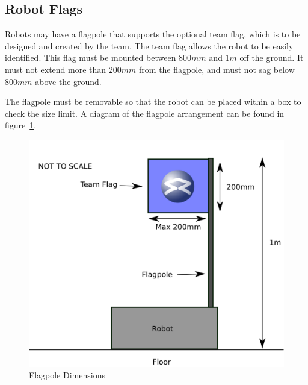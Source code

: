 \subsection{Robot Flags}
\label{sec:flags}
Robots may have a flagpole that supports the optional team flag, which
is to be designed and created by the team. The team flag allows the
robot to be easily identified.  This flag must be mounted between
$800mm$ and $1m$ off the ground.  It must not extend more than $200mm$
from the flagpole, and must not sag below $800mm$ above the ground.

The flagpole must be removable so that the robot can be placed within a box to check the size limit.
A diagram of the flagpole arrangement can be found in figure~\ref{fig:flag}.

\begin{figure}
\begin{center}
\includegraphics[keepaspectratio, scale =1]{./images/flag.png}
\caption{\label{fig:flag}Flagpole Dimensions}
\end{center}
\end{figure}
\clearpage
